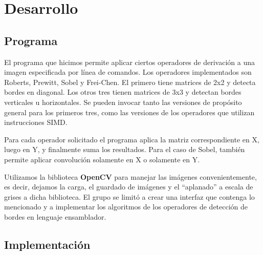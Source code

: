 \section{Desarrollo}

\subsection{Programa}

El programa que hicimos permite aplicar ciertos operadores de derivación a una imagen especificada por línea de comandos. Los operadores implementados son Roberts, Prewitt,  Sobel y Frei-Chen. El primero tiene matrices de 2x2 y detecta bordes en diagonal. Los otros tres tienen matrices de 3x3 y detectan bordes verticales u horizontales. Se pueden invocar tanto las versiones de propósito general para los primeros tres, como las versiones de los operadores que utilizan instrucciones SIMD. 

Para cada operador solicitado el programa aplica la matriz correspondiente en X, luego en Y, y finalmente suma los resultados. Para el caso de Sobel, también permite aplicar convolución solamente en X o solamente en Y.

Utilizamos la biblioteca \textbf{OpenCV} para manejar las imágenes convenientemente, es decir, dejamos la carga, el guardado de imágenes y el ``aplanado'' a escala de grises a dicha biblioteca. El grupo se limitó a crear una interfaz que contenga lo mencionado y a implementar los algoritmos de los operadores de detección de bordes en lenguaje ensamblador. 





\subsection{Implementación}

